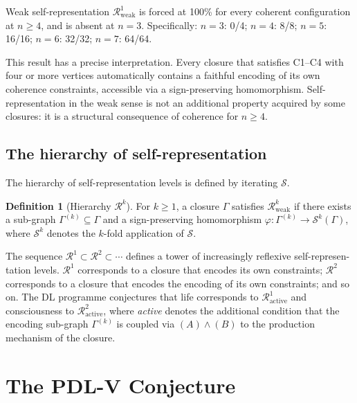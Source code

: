 \documentclass[12pt,a4paper]{article}
\theoremstyle{plain}
\theoremstyle{definition}
\newtheorem{definition}[theorem]{Definition}
\theoremstyle{remark}
\newenvironment{computedresult}[1][]{%
  \begin{tcolorbox}[computedstyle,title={Computational Result\ifx\relax#1\relax\else: #1\fi}]}{\end{tcolorbox}}
\newcommand{\Sop}{\mathcal{S}}
\newcommand{\Rop}{\mathcal{R}}
\begin{document}
\begin{computedresult}[Weak self-representation --- Script~5]
\label{thm:R1weak}
Weak self-representation $\Rop^1_{\mathrm{weak}}$ is forced at 100\% for every
coherent configuration at $n \geq 4$, and is absent at $n = 3$. Specifically:
$n=3$: 0/4; $n=4$: 8/8; $n=5$: 16/16; $n=6$: 32/32; $n=7$: 64/64.
\end{computedresult}

This result has a precise interpretation. Every closure that satisfies C1--C4 with
four or more vertices automatically contains a faithful encoding of its own coherence
constraints, accessible via a sign-preserving homomorphism. Self-representation in
the weak sense is not an additional property acquired by some closures: it is a
structural consequence of coherence for $n \geq 4$.

\subsection{The hierarchy of self-representation}

The hierarchy of self-representation levels is defined by iterating $\Sop$.

\begin{definition}[Hierarchy $\Rop^k$]
For $k \geq 1$, a closure $\Gamma$ satisfies $\Rop^k_{\mathrm{weak}}$ if there
exists a sub-graph $\Gamma^{(k)} \subseteq \Gamma$ and a sign-preserving homomorphism
$\varphi: \Gamma^{(k)} \to \Sop^k(\Gamma)$, where $\Sop^k$ denotes the $k$-fold
application of $\Sop$.
\end{definition}

The sequence $\Rop^1 \subset \Rop^2 \subset \cdots$ defines a tower of increasingly
reflexive self-represen-tation levels. $\Rop^1$ corresponds to a closure that encodes
its own constraints; $\Rop^2$ corresponds to a closure that encodes the encoding of
its own constraints; and so on. The DL programme conjectures that life corresponds
to $\Rop^1_{\mathrm{active}}$ and consciousness to $\Rop^2_{\mathrm{active}}$, where
\emph{active} denotes the additional condition that the encoding sub-graph
$\Gamma^{(k)}$ is coupled via $(A)\wedge(B)$ to the production mechanism of the
closure.

\section{The PDL-V Conjecture}
\label{sec:PDLV}
\end{document}
